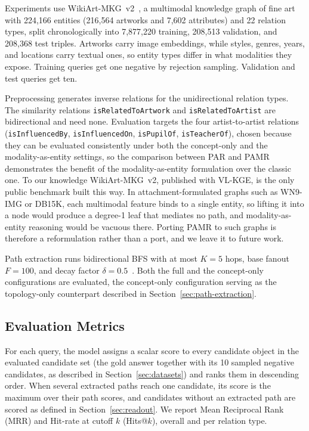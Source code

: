 \documentclass[runningheads]{llncs}
\begin{document}
Experiments use WikiArt-MKG~v2~\cite{efthymiou2026vlkge}, a multimodal
knowledge graph of fine art with 224,166 entities (216,564 artworks and
7,602 attributes) and 22 relation types, split chronologically into
7,877,220 training, 208,513 validation, and 208,368 test triples.
Artworks carry image embeddings, while styles, genres, years, and locations
carry textual ones, so entity types differ in what modalities they
expose. Training queries get one negative by rejection sampling.
Validation and test queries get ten.

Preprocessing generates inverse
relations for the unidirectional relation types. The similarity
relations \texttt{isRelatedToArtwork} and \texttt{isRelatedToArtist} are
bidirectional and need none. Evaluation targets the four artist-to-artist
relations (\texttt{isInfluencedBy},
\texttt{isInfluencedOn}, \texttt{isPupilOf}, \texttt{isTeacherOf}),
chosen because they can be evaluated consistently under both the
concept-only and the modality-as-entity settings, so the comparison
between PAR and PAMR demonstrates the benefit of the modality-as-entity
formulation over the classic one. To our knowledge WikiArt-MKG~v2,
published with VL-KGE, is the only public benchmark built this way. In
attachment-formulated graphs such as WN9-IMG or DB15K, each multimodal
feature binds to a single entity, so lifting it into a node would
produce a degree-1 leaf that mediates no path, and modality-as-entity
reasoning would be vacuous there. Porting PAMR to such graphs is
therefore a reformulation rather than a port, and we leave it to
future work.

Path extraction runs bidirectional BFS with at most $K = 5$ hops, base
fanout $F = 100$, and decay factor $\delta = 0.5$~\cite{icaart26}. Both
the full and the concept-only configurations are
evaluated, the concept-only configuration serving as the topology-only
counterpart described in Section~\ref{sec:path-extraction}.

\subsection{Evaluation Metrics}
\label{sec:evaluation-metrics}

For each query, the model assigns a scalar score to every candidate
object in the evaluated candidate set (the gold answer together with
its 10 sampled negative candidates, as described in
Section~\ref{sec:datasets}) and ranks them in descending order. When
several extracted paths reach one candidate, its score is the maximum
over their path scores, and candidates without an extracted path are
scored as defined in Section~\ref{sec:readout}. We
report Mean Reciprocal Rank (MRR) and Hit-rate at cutoff $k$
(Hits@$k$), overall and per relation type.
\end{document}
